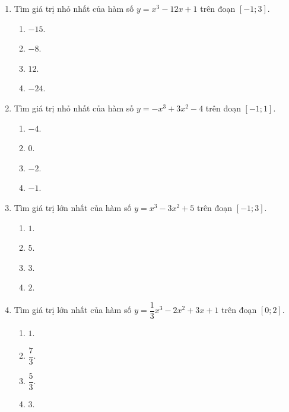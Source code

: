 \documentclass[12pt]{article}
\begin{document}
\begin{enumerate}[label=\textbf{Câu \arabic*.}]
		\item Tìm giá trị nhỏ nhất của hàm số $y = x^3 - 12x + 1$ trên đoạn $[-1; 3]$.
		\begin{multicols}{4}
			\begin{enumerate}[label=\textbf{\Alph*.}]
				\item $-15$.
				\item $-8$.
				\item $12$.
				\item $-24$.
			\end{enumerate}
		\end{multicols}
		
		\item Tìm giá trị nhỏ nhất của hàm số $y = -x^3 + 3x^2 - 4$ trên đoạn $[-1; 1]$.
		\begin{multicols}{4}
			\begin{enumerate}[label=\textbf{\Alph*.}]
				\item $-4$.
				\item $0$.
				\item $-2$.
				\item $-1$.
			\end{enumerate}
		\end{multicols}
		
		\item Tìm giá trị lớn nhất của hàm số $y = x^3 - 3x^2 + 5$ trên đoạn $[-1; 3]$.
		\begin{multicols}{4}
			\begin{enumerate}[label=\textbf{\Alph*.}]
				\item $1$.
				\item $5$.
				\item $3$.
				\item $2$.
			\end{enumerate}
		\end{multicols}
		
		\item Tìm giá trị lớn nhất của hàm số $y = \dfrac{1}{3}x^3 - 2x^2 + 3x + 1$ trên đoạn $[0; 2]$.
		\begin{multicols}{4}
			\begin{enumerate}[label=\textbf{\Alph*.}]
				\item $1$.
				\item $\dfrac{7}{3}$.
				\item $\dfrac{5}{3}$.
				\item $3$.
			\end{enumerate}
		\end{multicols}
		

\end{enumerate}
\end{document}
